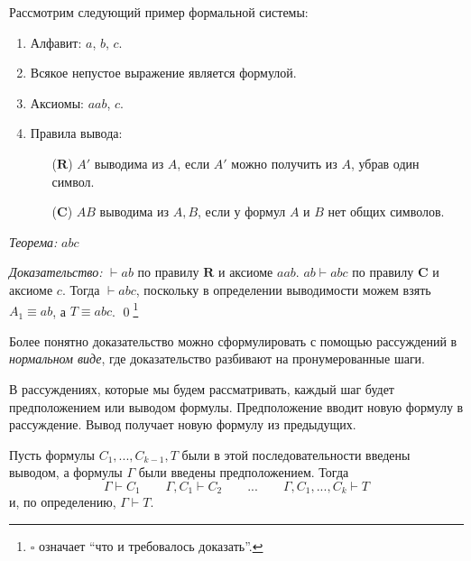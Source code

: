\newcommand\ruleR{\mathbf{R}}
\newcommand\ruleC{\mathbf{C}}

Рассмотрим следующий пример формальной системы:
\begin{enumerate}
  \item{}Алфавит: $a$, $b$, $c$.
  \item{}Всякое непустое выражение является формулой.
  \item{}Аксиомы: $aab$, $c$.
  \item{}Правила вывода:
  \begin{multicols}{2}
    \begin{enumerate}
      \item[($\ruleR$)]{}$A'$ выводима из $A$,
      если $A'$ можно получить из $A$, убрав один символ.
      \columnbreak
      \item[($\ruleC$)]{}$AB$ выводима из $A,B$,
      если у формул $A$ и $B$ нет общих символов.
    \end{enumerate}
  \end{multicols}
\end{enumerate}

{\it Теорема:} $abc$

{\it Доказательство:}
$\vdash ab$ по правилу $\ruleR$ и аксиоме $aab$.
$ab\vdash abc$ по правилу $\ruleC$ и аксиоме $c$.
Тогда $\vdash abc$, поскольку в определении выводимости можем
взять $A_1\equiv ab$, а $T\equiv abc$. \qed\footnote{
  $\square$ означает ``что и требовалось доказать''.}

Более понятно доказательство можно
сформулировать с помощью рассуждений в
{\it нормальном виде}, где доказательство
разбивают на пронумерованные шаги.

В рассуждениях, которые мы будем рассматривать, каждый шаг будет предположением
или выводом формулы. Предположение вводит новую формулу в рассуждение.
Вывод получает новую формулу из предыдущих.

Пусть формулы $C_1,...,C_{k-1},T$ были в этой последовательности введены выводом,
а формулы $\Gamma$ были введены предположением. Тогда
\begin{equation}\label{eq:nonel_vdash}
  \Gamma\vdash C_1\qquad \Gamma,C_1\vdash C_2\qquad ...\qquad
  \Gamma,C_1,...,C_{k}\vdash T
\end{equation}
и, по определению, $\Gamma\vdash T$.

